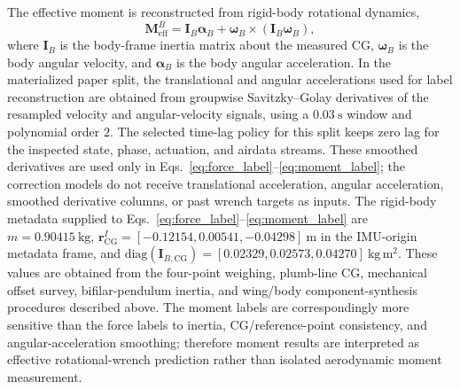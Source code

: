 The effective moment is reconstructed from rigid-body rotational dynamics,
\begin{equation}
  \mathbf{M}_{\mathrm{eff}}^{B}
  =
  \mathbf{I}_{B}\boldsymbol{\alpha}_{B}
  +
  \boldsymbol{\omega}_{B}
  \times
  \left(
    \mathbf{I}_{B}\boldsymbol{\omega}_{B}
  \right),
  \label{eq:moment_label}
\end{equation}
where $\mathbf{I}_{B}$ is the body-frame inertia matrix about the measured CG, $\boldsymbol{\omega}_{B}$ is the body angular velocity, and $\boldsymbol{\alpha}_{B}$ is the body angular acceleration. In the materialized paper split, the translational and angular accelerations used for label reconstruction are obtained from groupwise Savitzky--Golay derivatives of the resampled velocity and angular-velocity signals, using a $0.03~\mathrm{s}$ window and polynomial order $2$. The selected time-lag policy for this split keeps zero lag for the inspected state, phase, actuation, and airdata streams. These smoothed derivatives are used only in Eqs.~\eqref{eq:force_label}--\eqref{eq:moment_label}; the correction models do not receive translational acceleration, angular acceleration, smoothed derivative columns, or past wrench targets as inputs. The rigid-body metadata supplied to Eqs.~\eqref{eq:force_label}--\eqref{eq:moment_label} are $m=0.90415~\mathrm{kg}$, $\mathbf{r}_{\mathrm{CG}}^{I}=[-0.12154,0.00541,-0.04298]~\mathrm{m}$ in the IMU-origin metadata frame, and $\mathrm{diag}(\mathbf{I}_{B,\mathrm{CG}})=[0.02329,0.02573,0.04270]~\mathrm{kg\,m^2}$. These values are obtained from the four-point weighing, plumb-line CG, mechanical offset survey, bifilar-pendulum inertia, and wing/body component-synthesis procedures described above. The moment labels are correspondingly more sensitive than the force labels to inertia, CG/reference-point consistency, and angular-acceleration smoothing; therefore moment results are interpreted as effective rotational-wrench prediction rather than isolated aerodynamic moment measurement.


